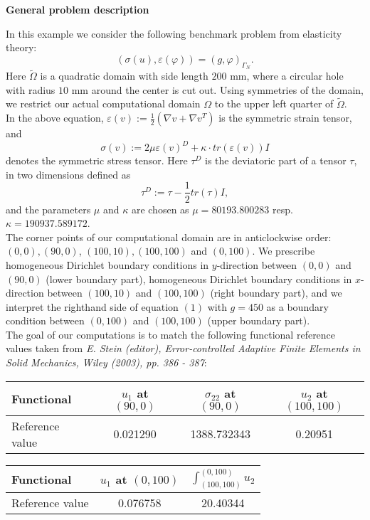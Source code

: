 \textbf{General problem description}

\vspace{0.2cm}

In this example we consider the following benchmark problem from elasticity theory:  
\begin{equation}
   (\sigma(u),\varepsilon(\varphi)) = (g,\varphi)_{\Gamma_N}.
\end{equation}
Here $\tilde{\Omega}$ is a quadratic domain with side length $200$ mm, where a circular hole with radius $10$ mm around the center is cut out. Using symmetries of the domain, we restrict our actual computational domain $\Omega$ to the upper left quarter of $\tilde{\Omega}$.\\
In the above equation, $\varepsilon(v) := \frac{1}{2}(\nabla v + \nabla v^T)$ is the symmetric strain tensor, and 
\begin{equation*}
   \sigma(v) := 2\mu \varepsilon(v)^D + \kappa \cdot tr (\varepsilon(v)) I
\end{equation*}
denotes the symmetric stress tensor. Here $\tau^D$ is the deviatoric part of a tensor $\tau$, in two dimensions defined as 
\begin{equation*}
   \tau^D := \tau - \frac{1}{2} tr(\tau) I,
\end{equation*}
and the parameters $\mu$ and $\kappa$ are chosen as $\mu = 80193.800283$ resp. $\kappa = 190937.589172$.\\
The corner points of our computational domain are in anticlockwise order: $(0,0), (90,0)$, $(100,10), (100,100)$ and $(0,100)$. We prescribe homogeneous Dirichlet boundary conditions in $y$-direction between $(0,0)$ and $(90,0)$ (lower boundary part), homogeneous Dirichlet boundary conditions in $x$-direction between $(100,10)$ and $(100,100)$ (right boundary part), and we interpret the righthand side of equation $(1)$ with $g = 450$ as a boundary condition between $(0,100)$ and $(100,100)$ (upper boundary part).\\
The goal of our computations is to match the following functional reference values taken from \textit{E. Stein (editor), Error-controlled Adaptive Finite Elements in Solid Mechanics, Wiley (2003), pp. 386 - 387}:
\begin{table}[h]
\centering
\begin{tabular}{lccc}    
\hline
 Functional & $u_1$ at $(90,0)$ & $\sigma_{22}$ at $(90,0)$ & $u_2$ at $(100,100)$\\
\hline 
 Reference value & 0.021290 & 1388.732343 & 0.20951\\
\hline
\end{tabular}
\end{table}
\begin{table}[h]
\centering
\begin{tabular}{lcc}    
\hline
 Functional & $u_1$ at $(0,100)$ & $\int_{(100,100)}^{(0,100)} u_2$\\
\hline 
 Reference value & 0.076758 & 20.40344\\
\hline
\end{tabular}
\end{table}

